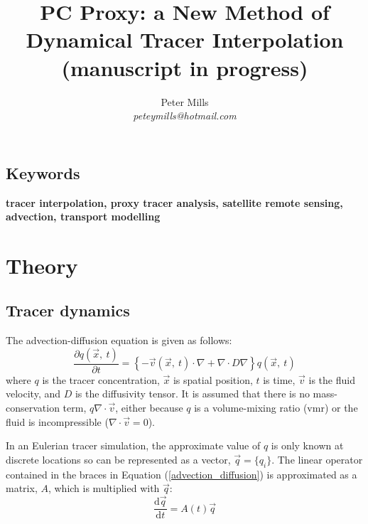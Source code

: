 \documentclass{article}
\begin{document}
\title{PC Proxy: a New Method of Dynamical Tracer Interpolation\\(manuscript in progress)}

\author{Peter Mills\\\textit{peteymills@hotmail.com}}

\maketitle

\pagestyle{myheadings}

\subsection*{Keywords}
\textbf{tracer interpolation, proxy tracer analysis, satellite remote sensing, advection, transport modelling}

\newcommand{\vect}[1]{\ensuremath{\vec #1}}

\tableofcontents

\section{Theory}

\subsection{Tracer dynamics}

The advection-diffusion equation is given as follows:
\begin{equation}
\frac{\partial q(\vect x, ~ t)}{\partial t} = \left \lbrace -\vect v(\vect x, ~t) \cdot \nabla + \nabla \cdot D \nabla \right \rbrace q(\vect x, ~ t)
\label{advection_diffusion}
\end{equation}
where $q$ is the tracer concentration, $\vect x$ is spatial position, 
$t$ is time, $\vect v$ is the fluid velocity, and $D$ is the diffusivity tensor.
It is assumed that there is no mass-conservation term, $q \nabla \cdot \vect v$,
either because $q$ is a volume-mixing ratio (vmr) or 
the fluid is incompressible ($\nabla \cdot \vec v = 0$).

In an Eulerian tracer simulation, the approximate value of $q$
is only known at discrete locations so can be represented as a vector,
$\vect q=\lbrace q_i \rbrace$.
The linear operator contained in the braces in Equation 
(\ref{advection_diffusion}) is approximated as a matrix, $A$, which is 
multiplied with $\vect q$:
\begin{equation}
\frac{\mathrm d \vect q}{\mathrm d t} = A(t) \vect q
\label{linear_ODE}
\end{equation}
\end{document}
